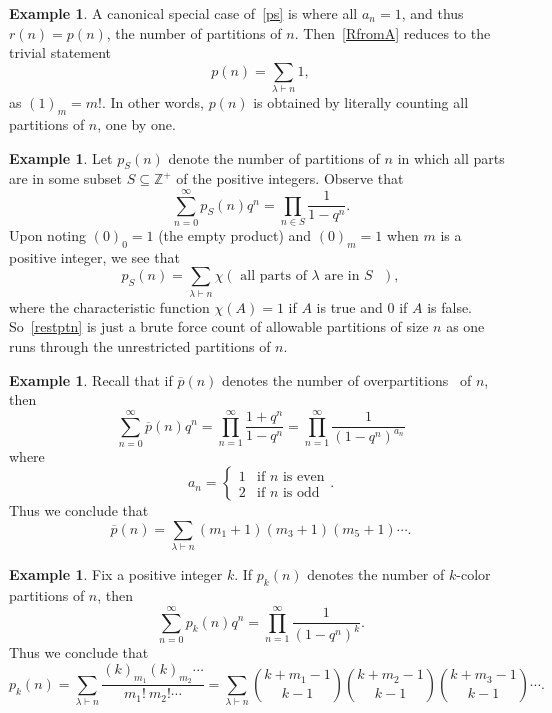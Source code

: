 \documentclass[10pt]{article}
\theoremstyle{definition}
\newtheorem{example}[theorem]{Example}
\numberwithin{theorem}{section}
\numberwithin{equation}{section}
\begin{document}
\begin{example}
A canonical special case of~\eqref{ps} is where all $a_n = 1$, and thus $r(n) = p(n)$, the 
number of partitions of $n$.  Then~\eqref{RfromA} reduces to the trivial statement
\[p(n) = \sum_{\lambda\vdash n} 1, \] as $(1)_m = m!$.  In other words, $p(n)$ is obtained by
literally counting all partitions of $n$, one by one.  
\end{example}

\begin{example}
  Let $p_S(n)$ denote the number of partitions of $n$ in which all parts are in some subset $S\subseteq \mathbb Z^+$ of
the positive integers.
Observe that
\begin{equation} 
\sum_{n=0}^\infty p_S(n) q^n = \prod_{n\in S} \frac{1}{1-q^n}.
\end{equation}
Upon noting $(0)_0 = 1$ (the empty product) and $(0)_m = 1$ when $m$ is a positive integer,
we see that 
\begin{equation} \label{restptn}
 p_S(n) =  \sum_{\lambda\vdash n} \chi( \mbox{ all parts of $\lambda$ are in $S$ }  ),
 \end{equation}
where the characteristic function $\chi(A) = 1$ if $A$ is true and $0$ if $A$ is false.
So~\eqref{restptn} is just a brute force count of allowable partitions of size $n$ as one runs through the
unrestricted partitions of $n$.
\end{example}

\begin{example}
Recall that if $\overline{p}(n)$ denotes the number of overpartitions~\cite{cl04} of $n$, then
\begin{equation} \label{OPgf}
\sum_{n=0}^\infty \overline{p}(n) q^n = \prod_{n=1}^\infty \frac{1+q^n}{1-q^n} = 
\prod_{n=1}^\infty \frac{1}{(1-q^n)^{a_n}}
\end{equation}
where 
\[ a_n = 
\begin{cases}  
  1 &\mbox{if $n$ is even} \\
  2 &\mbox{if $n$ is odd}
\end{cases} .
\]
Thus we conclude that
\begin{equation}
  \overline{p}(n) =  \sum_{\lambda\vdash n} (m_1 + 1) (m_3 + 1) (m_5 + 1) \cdots .
\end{equation}
\end{example}

\begin{example}  Fix a positive integer $k$.
If $p_k(n)$ denotes the number of $k$-color partitions of $n$, then 
\begin{equation} \label{kColorGF}
\sum_{n=0}^\infty p_k(n) q^n =\prod_{n=1}^\infty \frac{1}{(1-q^n)^{k}}.
\end{equation}
  Thus we conclude that
\begin{equation}
p_k(n) =  \sum_{\lambda\vdash n} \frac{(k)_{m_1} (k)_{m_2} \cdots}
{m_1!\ m_2!  \cdots}  =  \sum_{\lambda\vdash n} \binom{k+m_1 - 1}{k-1}
\binom{k+m_2 - 1}{k-1}  \binom{k+m_3 - 1}{k-1} \cdots.
\end{equation}
\end{example}
\end{document}
